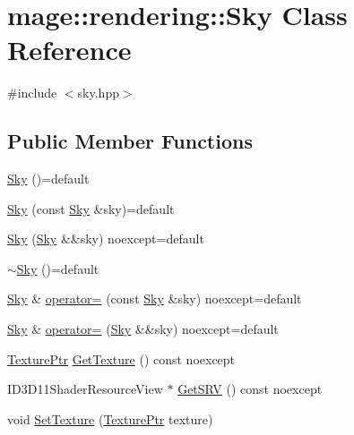 \hypertarget{classmage_1_1rendering_1_1_sky}{}\section{mage\+:\+:rendering\+:\+:Sky Class Reference}
\label{classmage_1_1rendering_1_1_sky}


{\ttfamily \#include $<$sky.\+hpp$>$}

\subsection*{Public Member Functions}
\begin{DoxyCompactItemize}
\item 
\hyperlink{classmage_1_1rendering_1_1_sky_a9f6ff8985b45e1a175d5dfdfeda33143}{Sky} ()=default
\item 
\hyperlink{classmage_1_1rendering_1_1_sky_aeafa720fff92be3f02d484a47443b973}{Sky} (const \hyperlink{classmage_1_1rendering_1_1_sky}{Sky} \&sky)=default
\item 
\hyperlink{classmage_1_1rendering_1_1_sky_aa1484300b69e97812d73e0f5281d8bbc}{Sky} (\hyperlink{classmage_1_1rendering_1_1_sky}{Sky} \&\&sky) noexcept=default
\item 
\hyperlink{classmage_1_1rendering_1_1_sky_a948ac13394c361864f1da3dc27ab3326}{$\sim$\+Sky} ()=default
\item 
\hyperlink{classmage_1_1rendering_1_1_sky}{Sky} \& \hyperlink{classmage_1_1rendering_1_1_sky_a9654c598bd30fee1b0892b0abf7b7c96}{operator=} (const \hyperlink{classmage_1_1rendering_1_1_sky}{Sky} \&sky) noexcept=default
\item 
\hyperlink{classmage_1_1rendering_1_1_sky}{Sky} \& \hyperlink{classmage_1_1rendering_1_1_sky_a01b1145f77fdab81e7dce93f6a524b45}{operator=} (\hyperlink{classmage_1_1rendering_1_1_sky}{Sky} \&\&sky) noexcept=default
\item 
\hyperlink{namespacemage_1_1rendering_a6f3ae54f825328465b0cdde0f0de4a36}{Texture\+Ptr} \hyperlink{classmage_1_1rendering_1_1_sky_a575698f7fafad47d544f88bf4e2eea5e}{Get\+Texture} () const noexcept
\item 
I\+D3\+D11\+Shader\+Resource\+View $\ast$ \hyperlink{classmage_1_1rendering_1_1_sky_a8ded7262b242de3e76e4bdcd5a91f4c3}{Get\+S\+RV} () const noexcept
\item 
void \hyperlink{classmage_1_1rendering_1_1_sky_aca571c68ad345801051fcc36e32013e6}{Set\+Texture} (\hyperlink{namespacemage_1_1rendering_a6f3ae54f825328465b0cdde0f0de4a36}{Texture\+Ptr} texture)
\end{DoxyCompactItemize}
